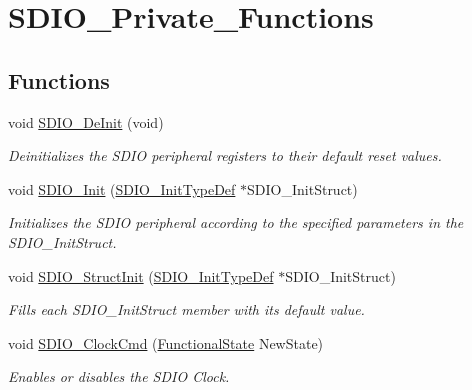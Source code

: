 \hypertarget{group___s_d_i_o___private___functions}{}\section{S\+D\+I\+O\+\_\+\+Private\+\_\+\+Functions}
\label{group___s_d_i_o___private___functions}
\subsection*{Functions}
\begin{DoxyCompactItemize}
\item 
void \mbox{\hyperlink{group___s_d_i_o___private___functions_gac359d2c6c67a2590f8f9b720c0e4ff1b}{S\+D\+I\+O\+\_\+\+De\+Init}} (void)
\begin{DoxyCompactList}\small\item\em Deinitializes the S\+D\+IO peripheral registers to their default reset values. \end{DoxyCompactList}\item 
void \mbox{\hyperlink{group___s_d_i_o___private___functions_gad40764a8e37c0ed5c9141ae338ff0203}{S\+D\+I\+O\+\_\+\+Init}} (\mbox{\hyperlink{struct_s_d_i_o___init_type_def}{S\+D\+I\+O\+\_\+\+Init\+Type\+Def}} $\ast$S\+D\+I\+O\+\_\+\+Init\+Struct)
\begin{DoxyCompactList}\small\item\em Initializes the S\+D\+IO peripheral according to the specified parameters in the S\+D\+I\+O\+\_\+\+Init\+Struct. \end{DoxyCompactList}\item 
void \mbox{\hyperlink{group___s_d_i_o___private___functions_ga778d338c29df4fae9ef69432e6df32ad}{S\+D\+I\+O\+\_\+\+Struct\+Init}} (\mbox{\hyperlink{struct_s_d_i_o___init_type_def}{S\+D\+I\+O\+\_\+\+Init\+Type\+Def}} $\ast$S\+D\+I\+O\+\_\+\+Init\+Struct)
\begin{DoxyCompactList}\small\item\em Fills each S\+D\+I\+O\+\_\+\+Init\+Struct member with its default value. \end{DoxyCompactList}\item 
void \mbox{\hyperlink{group___s_d_i_o___private___functions_ga7243b857d6b323748ff3a493b265bedc}{S\+D\+I\+O\+\_\+\+Clock\+Cmd}} (\mbox{\hyperlink{group___exported__types_gac9a7e9a35d2513ec15c3b537aaa4fba1}{Functional\+State}} New\+State)
\begin{DoxyCompactList}\small\item\em Enables or disables the S\+D\+IO Clock. \end{DoxyCompactList}\item 

\end{DoxyCompactItemize}
